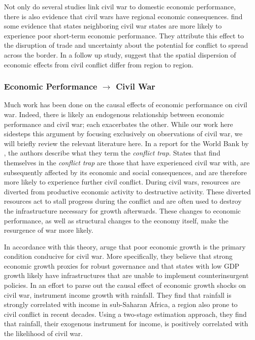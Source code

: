 Not only do several studies link civil war to domestic economic performance, there is also evidence that civil wars have regional economic consequences.  \cite{murdoch:sandler:2002a} find some evidence that states neighboring civil war states are more likely to experience poor short-term economic performance.  They attribute this effect to the disruption of trade and uncertainty about the potential for conflict to spread across the border.  In a follow up study, \cite{murdoch:sandler:2002b} suggest that the spatial dispersion of economic effects from civil conflict differ from region to region.

\subsubsection{Economic Performance $\rightarrow$ Civil War}


Much work has been done on the causal effects of economic performance on civil war.  Indeed, there is likely an endogenous relationship between economic performance and civil war; each exacerbates the other.  While our work here sidesteps this argument by focusing exclusively on observations of civil war, we will briefly review the relevant literature here.  In a report for the World Bank by \cite{collier:etal:2003}, the authors describe what they term the \textit{conflict trap}.  States that find themselves in the \textit{conflict trap} are those that have experienced civil war with, are subsequently affected by its economic and social consequences, and are therefore more likely to experience further civil conflict.  During civil wars, resources are diverted from productive economic activity to destructive activity.  These diverted resources act to stall progress during the conflict and are often used to destroy the infrastructure necessary for growth afterwards.  These changes to economic performance, as well as structural changes to the economy itself, make the resurgence of war more likely.  

In accordance with this theory, \cite{fearon:laitin:2003} aruge that poor economic growth is the primary condition conducive for civil war.  More specifically, they believe that strong economic growth proxies for robust governance and that states with low GDP growth likely have infrastructures that are unable to implement counterinsurgent policies.  In an effort to parse out the causal effect of economic growth shocks on civil war, \cite{miguel:etal:2004} instrument income growth with rainfall.  They find that rainfall is strongly correlated with income in sub-Saharan Africa, a region also prone to civil conflict in recent decades.   Using a two-stage estimation approach, they find that rainfall, their exogenous instrument for income, is positively correlated with the likelihood of civil war.

